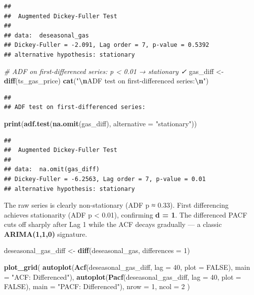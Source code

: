 \documentclass[
]{article}
\newenvironment{Shaded}{\begin{snugshade}}{\end{snugshade}}
\newcommand{\AttributeTok}[1]{\textcolor[rgb]{0.13,0.29,0.53}{#1}}
\newcommand{\CommentTok}[1]{\textcolor[rgb]{0.56,0.35,0.01}{\textit{#1}}}
\newcommand{\ConstantTok}[1]{\textcolor[rgb]{0.56,0.35,0.01}{#1}}
\newcommand{\DecValTok}[1]{\textcolor[rgb]{0.00,0.00,0.81}{#1}}
\newcommand{\FunctionTok}[1]{\textcolor[rgb]{0.13,0.29,0.53}{\textbf{#1}}}
\newcommand{\NormalTok}[1]{#1}
\newcommand{\OtherTok}[1]{\textcolor[rgb]{0.56,0.35,0.01}{#1}}
\newcommand{\SpecialCharTok}[1]{\textcolor[rgb]{0.81,0.36,0.00}{\textbf{#1}}}
\newcommand{\StringTok}[1]{\textcolor[rgb]{0.31,0.60,0.02}{#1}}
\begin{document}
\begin{verbatim}
## 
##  Augmented Dickey-Fuller Test
## 
## data:  deseasonal_gas
## Dickey-Fuller = -2.091, Lag order = 7, p-value = 0.5392
## alternative hypothesis: stationary
\end{verbatim}

\begin{Shaded}
\begin{Highlighting}[]
\CommentTok{\# ADF on first{-}differenced series: p \textless{} 0.01 → stationary ✓}
\NormalTok{gas\_diff }\OtherTok{\textless{}{-}} \FunctionTok{diff}\NormalTok{(ts\_gas\_price)}
\FunctionTok{cat}\NormalTok{(}\StringTok{"}\SpecialCharTok{\textbackslash{}n}\StringTok{ADF test on first{-}differenced series:}\SpecialCharTok{\textbackslash{}n}\StringTok{"}\NormalTok{)}
\end{Highlighting}
\end{Shaded}

\begin{verbatim}
## 
## ADF test on first-differenced series:
\end{verbatim}

\begin{Shaded}
\begin{Highlighting}[]
\FunctionTok{print}\NormalTok{(}\FunctionTok{adf.test}\NormalTok{(}\FunctionTok{na.omit}\NormalTok{(gas\_diff), }\AttributeTok{alternative =} \StringTok{"stationary"}\NormalTok{))}
\end{Highlighting}
\end{Shaded}

\begin{verbatim}
## 
##  Augmented Dickey-Fuller Test
## 
## data:  na.omit(gas_diff)
## Dickey-Fuller = -6.2563, Lag order = 7, p-value = 0.01
## alternative hypothesis: stationary
\end{verbatim}

The raw series is clearly non-stationary (ADF p ≈ 0.33). First
differencing achieves stationarity (ADF p \textless{} 0.01), confirming
\textbf{d = 1}. The differenced PACF cuts off sharply after Lag 1 while
the ACF decays gradually --- a classic \textbf{ARIMA(1,1,0)} signature.

\begin{Shaded}
\begin{Highlighting}[]
\NormalTok{deseasonal\_gas\_diff }\OtherTok{\textless{}{-}} \FunctionTok{diff}\NormalTok{(deseasonal\_gas, }\AttributeTok{differences =} \DecValTok{1}\NormalTok{)}

\FunctionTok{plot\_grid}\NormalTok{(}
  \FunctionTok{autoplot}\NormalTok{(}\FunctionTok{Acf}\NormalTok{(deseasonal\_gas\_diff,  }\AttributeTok{lag =} \DecValTok{40}\NormalTok{, }\AttributeTok{plot =} \ConstantTok{FALSE}\NormalTok{), }\AttributeTok{main =} \StringTok{"ACF: Differenced"}\NormalTok{),}
  \FunctionTok{autoplot}\NormalTok{(}\FunctionTok{Pacf}\NormalTok{(deseasonal\_gas\_diff, }\AttributeTok{lag =} \DecValTok{40}\NormalTok{, }\AttributeTok{plot =} \ConstantTok{FALSE}\NormalTok{), }\AttributeTok{main =} \StringTok{"PACF: Differenced"}\NormalTok{),}
  \AttributeTok{nrow =} \DecValTok{1}\NormalTok{, }\AttributeTok{ncol =} \DecValTok{2}
\NormalTok{)}
\end{Highlighting}
\end{Shaded}
\end{document}
